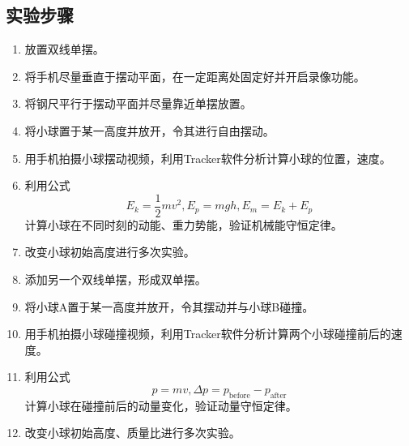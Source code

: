 \documentclass[UTF8]{article}
\begin{document}
        \subsection{实验步骤}
            \begin{enumerate}[left=2em, label=(\arabic*)]
                \item 放置双线单摆。
                \item 将手机尽量垂直于摆动平面，在一定距离处固定好并开启录像功能。
                \item 将钢尺平行于摆动平面并尽量靠近单摆放置。
                \item 将小球置于某一高度并放开，令其进行自由摆动。
                \item 用手机拍摄小球摆动视频，利用Tracker软件分析计算小球的位置，速度。
                \item 利用公式
                $$ E_k = \frac{1}{2}mv^2, E_p = mgh, E_m = E_k + E_p $$                
                计算小球在不同时刻的动能、重力势能，验证机械能守恒定律。
                \item 改变小球初始高度进行多次实验。
                \item 添加另一个双线单摆，形成双单摆。
                \item 将小球A置于某一高度并放开，令其摆动并与小球B碰撞。
                \item 用手机拍摄小球碰撞视频，利用Tracker软件分析计算两个小球碰撞前后的速度。
                \item 利用公式
                $$ p = mv, \Delta p = p_{\text{before}} - p_{\text{after}} $$
                计算小球在碰撞前后的动量变化，验证动量守恒定律。
                \item 改变小球初始高度、质量比进行多次实验。
            \end{enumerate}
\end{document}
